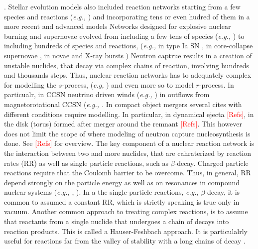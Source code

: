 \documentclass[11pt,a4paper,headinclude=true,DIV=14,BCOR=8mm,chapterprefix,listof=totoc,twoside,openright,abstracton]{scrbook}
\newcommand{\red}[1]{\textcolor{red}{#1}}
\begin{document}
\cite{Wagoner:1973,Orlov:2000,Nollett:2000fh,Coc:2013eha,Cyburt:2015mya}. 
Stellar evolution models also included reaction networks starting from a few species and reactions (\textit{e.g.,} \cite{Hayashi:1962,Hofmeister:1964}) and incorporating tens or even hudred of them in a more recent and advanced models \cite{Arnett:1977,Weaver:1978,Paxton:2011,Bressan:2012,Jones:2015}
Networks designed for explosive nuclear burning and supernovae evolved from including a few tens of species (\textit{e.g.,} \cite{Truran:1966,Truran:1967,Arnett:1969,Woosley:1973}) to including hundreds of species and reactions, (\textit{e.g.,} in type Ia SN \cite{Thielemann:1986,Hillebrandt:2013gna,Seitenzahl:2013,Leung:2015fxa}, in core-collapse supernovae \cite{Thielemann:1986,Limongi:2003ui,Heger:2008td,Harris:2014}, in novae \cite{Weiss:1990,Jose:1997vf,Iliadis:2002zz,Starrfield:2016} and X-ray bursts \cite{Schatz:2001xx,Woosley:2003cd,Cyburt:2010,Parikh:2012hx}) 
Neutron captrue results in a creation of unstable nuclides, that decay via complex chains of reaction, involving hundreds and thousands steps. Thus, nuclear reaction networks has to adequately complex for modelling the $s$-process, (\textit{e.g,} \cite{Prantzos:1990,Kaeppeler:2011,Nishimura:2017zdi}) and even more so to model $r$-process. In particualr, in CCSN neutrino driven winds (\textit{e.g.,} \cite{Woosley:1992,Arcones:2010,Wanajo:2013}) in outflows from magnetorotational CCSN (\textit{e.g., \cite{Winteler:2012,Nishimura:2015nca}}. In compact object mergers several cites with different conditions require modelling. In particular, in dynamical ejecta \cite{Goriely:2011vg,Bauswein:2013,Wanajo:2014,Just:2014,Fernandez:2016sbf}\red{[Refs]}, in the disk (torus) formed after merger around the remnant \cite{Surman:2008qf,Perego:2014fma,Martin:2015hxa,Lippuner:2017tyn}\red{[Refs]}. This however does not limit the scope of where modeling of neutron capture nucleosynthesis is done. See \cite{Blinnikov:1996,Panov:1995,Panov:2001,Mumpower:2011ar}\red{[Refs]} for overview.
The key component of a nuclear reaction network is the interaction between two and more nuclides, that are cahraterized by reaction rates (RR) as well as single particle reactions, such as $\beta$-decay.
Charged particle reactions require that the Coulomb barrier to be overcome. Thus, in general, RR depend strongly on the particle energy as well as on resonances in compound nuclear systems (\textit{e.g.,} \cite{Clayton:1968}, ). 
In a the single-particle reactions, \textit{e.g.,} $\beta$-decay, it is common to assumed a constant RR, which is strictly speaking is true only in vacuum. Another common approach to treating complex reactions, is to assume that reactants from a single nuclide that undergoes a chain of decays into reaction products. This is called a Hauser-Feshbach approach. It is particulalrly useful for reactions far from the valley of stability with a long chains of decay \cite{Hauser:1952,Rauscher:2000fx,Goriely:2008zu}. 
\end{document}
